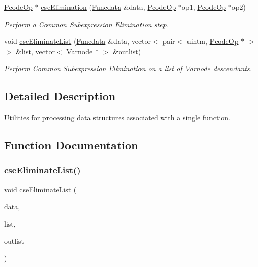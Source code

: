 \begin{DoxyCompactItemize}
\mbox{\hyperlink{class_pcode_op}{Pcode\+Op}} $\ast$ \mbox{\hyperlink{funcdata_8hh_aec60042aabc4e62a2625348cf20d321c}{cse\+Elimination}} (\mbox{\hyperlink{class_funcdata}{Funcdata}} \&data, \mbox{\hyperlink{class_pcode_op}{Pcode\+Op}} $\ast$op1, \mbox{\hyperlink{class_pcode_op}{Pcode\+Op}} $\ast$op2)
\begin{DoxyCompactList}\small\item\em Perform a Common Subexpression Elimination step. \end{DoxyCompactList}\item 
void \mbox{\hyperlink{funcdata_8hh_ae9a4fb024ff5b75071188b12a9bcdce0}{cse\+Eliminate\+List}} (\mbox{\hyperlink{class_funcdata}{Funcdata}} \&data, vector$<$ pair$<$ uintm, \mbox{\hyperlink{class_pcode_op}{Pcode\+Op}} $\ast$ $>$ $>$ \&list, vector$<$ \mbox{\hyperlink{class_varnode}{Varnode}} $\ast$ $>$ \&outlist)
\begin{DoxyCompactList}\small\item\em Perform Common Subexpression Elimination on a list of \mbox{\hyperlink{class_varnode}{Varnode}} descendants. \end{DoxyCompactList}\end{DoxyCompactItemize}


\subsection{Detailed Description}
Utilities for processing data structures associated with a single function. 



\subsection{Function Documentation}
\mbox{\label{funcdata_8hh_ae9a4fb024ff5b75071188b12a9bcdce0}} 
\subsubsection{\texorpdfstring{cseEliminateList()}{cseEliminateList()}}
{\footnotesize\ttfamily void cse\+Eliminate\+List (\begin{DoxyParamCaption}\item[{\mbox{\hyperlink{class_funcdata}{Funcdata}} \&}]{data,  }\item[{vector$<$ pair$<$ uintm, \mbox{\hyperlink{class_pcode_op}{Pcode\+Op}} $\ast$ $>$ $>$ \&}]{list,  }\item[{vector$<$ \mbox{\hyperlink{class_varnode}{Varnode}} $\ast$ $>$ \&}]{outlist }\end{DoxyParamCaption})}




